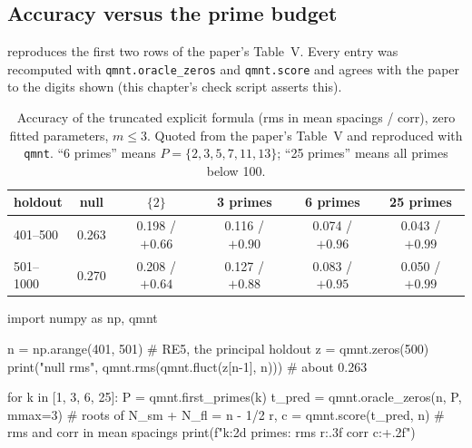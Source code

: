 \subsection{Accuracy versus the prime budget}

 reproduces the first two rows of the paper's Table~V. Every entry was recomputed with \texttt{qmnt.oracle\_zeros} and \texttt{qmnt.score} and agrees with the paper to the digits shown (this chapter's check script asserts this).

\begin{table}[htbp]\centering
\caption{Accuracy of the truncated explicit formula (rms in mean spacings / corr), zero fitted parameters, $m\le3$. Quoted from the paper's Table~V and reproduced with \texttt{qmnt}. ``6 primes'' means $P=\{2,3,5,7,11,13\}$; ``25 primes'' means all primes below 100.}
\label{tab:explicit-formula-tableV}
\begin{tabular}{lccccc}
\toprule
holdout & null & $\{2\}$ & 3 primes & 6 primes & 25 primes\\
\midrule
401--500 & 0.263 & 0.198 / $+0.66$ & 0.116 / $+0.90$ & 0.074 / $+0.96$ & 0.043 / $+0.99$\\
501--1000 & 0.270 & 0.208 / $+0.64$ & 0.127 / $+0.88$ & 0.083 / $+0.95$ & 0.050 / $+0.99$\\
\bottomrule
\end{tabular}
\end{table}

\begin{pycode}
import numpy as np, qmnt

n = np.arange(401, 501)                       # RE5, the principal holdout
z = qmnt.zeros(500)
print("null rms", qmnt.rms(qmnt.fluct(z[n-1], n)))   # about 0.263

for k in [1, 3, 6, 25]:
    P = qmnt.first_primes(k)
    t_pred = qmnt.oracle_zeros(n, P, mmax=3)   # roots of N_sm + N_fl = n - 1/2
    r, c = qmnt.score(t_pred, n)               # rms and corr in mean spacings
    print(f"{k:2d} primes: rms {r:.3f}  corr {c:+.2f}")
\end{pycode}

